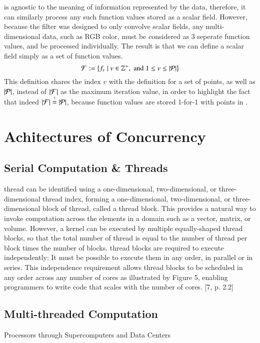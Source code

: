  is agnostic to the meaning of information represented by the data, therefore, it can similarly process any such function values stored as a scalar field. However, because the filter was designed to only convolve scalar fields, any multi-dimensional data, such as RGB color, must be considered as 3 seperate function values, and be processed individually. The result is that we can define a scalar field simply as a set of function values.
%
\begin{equation}
	\mathcal{F} := \left \{f_v \mid v \in \mathbb{Z}^+, \;\text{and}\; 1\leq v \leq|\mathcal{P}| \right \}
	\label{eq:defineSetOfFunctionValues}
\end{equation}
%
This definition shares the index $v$ with the definition for a set of points, as well as $|\mathcal{P}|$, instead of $|\mathcal{F}|$ as the maximum iteration value, in order to highlight the fact that indeed $|\mathcal{F}| \overset{!}{=} |\mathcal{P}|$, because function values are stored 1-for-1 with points in \tdd{}.
%
%
%
%
\section{Achitectures of Concurrency}
%
\subsection{Serial Computation \& Threads}
thread can be identified using a one-dimensional, two-dimensional, or three-
dimensional thread index, forming a one-dimensional, two-dimensional, or three-
dimensional block of thread, called a thread block. This provides a natural way
to invoke computation across the elements in a domain such as a vector, matrix,
or volume. However, a kernel can be executed by multiple equally-shaped thread
blocks, so that the total number of thread is equal to the number of thread
per block times the number of blocks. thread blocks are required to execute
independently: It must be possible to execute them in any order, in parallel or
in series. This independence requirement allows thread blocks to be scheduled
in any order across any number of cores as illustrated by Figure 5, enabling
programmers to write code that scales with the number of cores. [7, p. 2.2]
%
\subsection{Multi-threaded Computation}
Processors through Supercomputers and Data Centers
%

